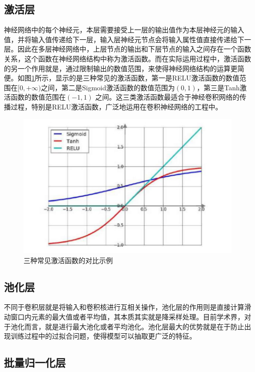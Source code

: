 \subsection{激活层}

神经网络中的每个神经元，本层需要接受上一层的输出值作为本层神经元的输入值，并将输入值传递给下一层，输入层神经元节点会将输入属性值直接传递给下一层。因此在多层神经网络中，上层节点的输出和下层节点的输入之间存在一个函数关系，这个函数在神经网络结构中称为激活函数。而在实际运用过程中，激活函数的另一个作用就是，通过限制输出的数值范围，来使得神经网络结构的运算更简便。如图\ref{relu}所示，显示的是三种常见的激活函数，第一是RELU激活函数的数值范围在$[0, + \infty )$之间，第二是Sigmoid激活函数的数值范围为$(0,1)$，第三是Tanh激活函数的数值范围在$(-1,1)$ 之间。这三类激活函数最适合于神经卷积网络的传播过程，特别是RELU激活函数，广泛地运用在卷积神经网络的工程中。

\begin{figure}[h]
	\includegraphics[width=\textwidth]{pic/relu.jpg}
	\caption{三种常见激活函数的对比示例}
	\label{relu}
\end{figure}

\subsection{池化层}

不同于卷积层就是将输入和卷积核进行互相关操作，池化层的作用则是直接计算滑动窗口内元素的最大值或者平均值，其本质其实就是降采样处理。目前学术界，对于池化而言，就是进行最大池化或者平均池化。池化层最大的优势就是在于防止出现训练过程中的过拟合问题，使得模型可以抽取更广泛的特征。

\subsection{批量归一化层}

